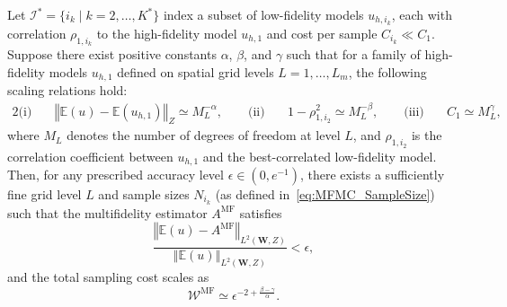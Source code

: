 %
\begin{theorem}\label{thm:Sample_cost_est}
Let $\mathcal{I}^* = \{i_k \mid k = 2, \ldots, K^*\}$ index a subset of low-fidelity models $u_{h,i_k}$, each with correlation $\rho_{1,i_k}$ to the high-fidelity model $u_{h,1}$ and cost per sample $C_{i_k} \ll C_1$. Suppose there exist positive constants $\alpha$, $\beta$, and $\gamma$ such that for a family of high-fidelity models $u_{h,1}$ defined on spatial grid levels $L = 1, \ldots, L_m$, the following scaling relations hold:
%
\begin{alignat*}{2}
    \text{(i)}\quad & \left\Vert \mathbb{E}(u) - \mathbb{E}(u_{h,1}) \right\Vert_Z \simeq M_L^{-\alpha}, \qquad
    \text{(ii)}\quad & 1 - \rho_{1,i_2}^2 \simeq M_L^{-\beta}, \qquad
    \text{(iii)}\quad & C_1 \simeq M_L^{\gamma},
\end{alignat*}
%
where $M_L$ denotes the number of degrees of freedom at level $L$, and $\rho_{1,i_2}$ is the correlation coefficient between $u_{h,1}$ and the best-correlated low-fidelity model. Then, for any prescribed accuracy level $\epsilon \in (0,e^{-1})$, there exists a sufficiently fine grid level $L$ and sample sizes $N_{i_k}$ (as defined in~\eqref{eq:MFMC_SampleSize}) such that the multifidelity estimator $A^{\mathrm{MF}}$ satisfies
\[
\frac{\left\Vert \mathbb{E}(u) - A^{\mathrm{MF}} \right\Vert_{L^2(\boldsymbol{W},Z)}}{\left\Vert \mathbb{E}(u) \right\Vert_{L^2(\boldsymbol{W},Z)}} < \epsilon,
\]
and the total sampling cost scales as
\[
\mathcal{W}^{\mathrm{MF}} \simeq \epsilon^{-2 + \frac{\beta - \gamma}{\alpha}}.
\]
\end{theorem}
%










